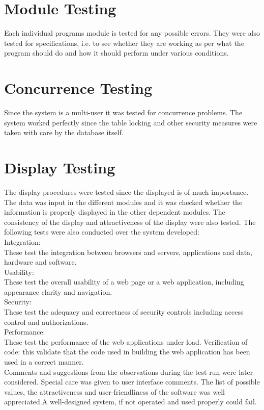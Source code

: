 \section{ Module Testing}
Each individual programs module is tested for any possible errors. They were also tested for specifications, i.e. to see whether they are working as per what the program should do and how it should perform under various conditions.
\section{ Concurrence Testing}
Since the system is a multi-user it was tested for concurrence problems. The system worked perfectly since the table locking and other security measures were taken with care by the database itself.

\section{Display Testing}
The display procedures were tested since the displayed is of much importance. The data was input in the different modules and it was checked whether the information is properly displayed in the other dependent modules. The consistency of the display and attractiveness of the display were also tested. The following tests were also conducted over the system developed:\\
Integration:\\
 These test the integration between browsers and servers, applications and data, hardware and software.\\
Usability:\\
 These test the overall usability of a web page or a web application, including appearance clarity and navigation.\\
Security:\\
 These test the adequacy and correctness of security controls including access control and authorizations.\\
Performance:\\
 These test the performance of the web applications under load.
Verification of code: this validate that the code used in building the web application has been used in a correct manner.\\
Comments and suggestions from the observations during the test run were later considered. Special care was given to user interface comments. The list of possible values, the attractiveness and user-friendliness of the software was well appreciated.A well-designed system, if not operated and used properly could fail.\\
